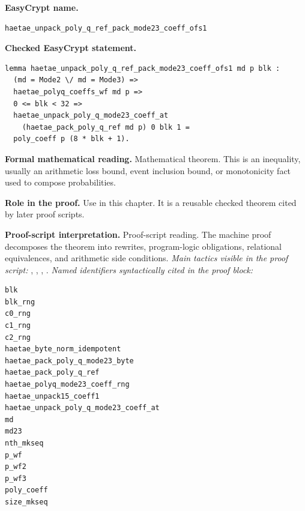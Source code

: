 \begin{formaltheorem}
\noindent\textbf{EasyCrypt name.}
\begin{lstlisting}[language=EasyCrypt,basicstyle=\ttfamily\scriptsize]
haetae_unpack_poly_q_ref_pack_mode23_coeff_ofs1
\end{lstlisting}
\noindent\textbf{Checked EasyCrypt statement.}
\begin{lstlisting}[language=EasyCrypt,basicstyle=\ttfamily\scriptsize]
lemma haetae_unpack_poly_q_ref_pack_mode23_coeff_ofs1 md p blk :
  (md = Mode2 \/ md = Mode3) =>
  haetae_polyq_coeffs_wf md p =>
  0 <= blk < 32 =>
  haetae_unpack_poly_q_mode23_coeff_at
    (haetae_pack_poly_q_ref md p) 0 blk 1 =
  poly_coeff p (8 * blk + 1).
\end{lstlisting}
\noindent\textbf{Formal mathematical reading.}
Mathematical theorem. This is an inequality, usually an arithmetic loss bound, event inclusion bound, or monotonicity fact used to compose probabilities.

\noindent\textbf{Role in the proof.}
Use in this chapter. It is a reusable checked theorem cited by later proof scripts.

\noindent\textbf{Proof-script interpretation.}
Proof-script reading. The machine proof decomposes the theorem into rewrites, program-logic obligations, relational equivalences, and arithmetic side conditions.
\emph{Main tactics visible in the proof script:} , , , .
\emph{Named identifiers syntactically cited in the proof block:}
\begin{lstlisting}[language=EasyCrypt,basicstyle=\ttfamily\scriptsize]
blk
blk_rng
c0_rng
c1_rng
c2_rng
haetae_byte_norm_idempotent
haetae_pack_poly_q_mode23_byte
haetae_pack_poly_q_ref
haetae_polyq_mode23_coeff_rng
haetae_unpack15_coeff1
haetae_unpack_poly_q_mode23_coeff_at
md
md23
nth_mkseq
p_wf
p_wf2
p_wf3
poly_coeff
size_mkseq
\end{lstlisting}

\end{formaltheorem}

